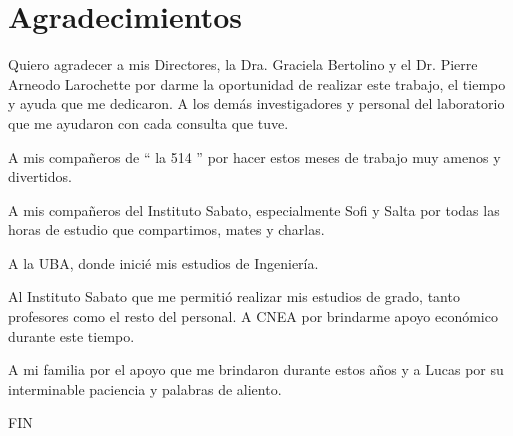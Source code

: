 \documentclass[a4paper,12pt,fleqn,twoside,openany]{book}
\begin{document}
\chapter*{Agradecimientos}

Quiero agradecer a mis Directores, la Dra. Graciela Bertolino y el Dr. Pierre Arneodo Larochette por darme la oportunidad de realizar este trabajo, el tiempo y ayuda que me dedicaron. A los demás investigadores y personal del laboratorio que me ayudaron con cada consulta que tuve.

\vspace{5mm}

A mis compañeros de `` la 514 ''  por hacer estos meses de trabajo muy amenos y divertidos.

\vspace{5mm}

A mis compañeros del Instituto Sabato, especialmente Sofi y Salta por todas las horas de estudio que compartimos, mates y charlas.

\vspace{5mm}

A la UBA, donde inicié mis estudios de Ingeniería.  

\vspace{5mm}

Al Instituto Sabato que me permitió realizar mis estudios de grado, tanto profesores como el resto del personal. A CNEA por brindarme apoyo económico durante este tiempo.

\vspace{5mm}

A mi familia por el apoyo que me brindaron durante estos años y a Lucas por su interminable paciencia y palabras de aliento.

\vspace{5mm}



\vfill

\centering

FIN
\end{document}
